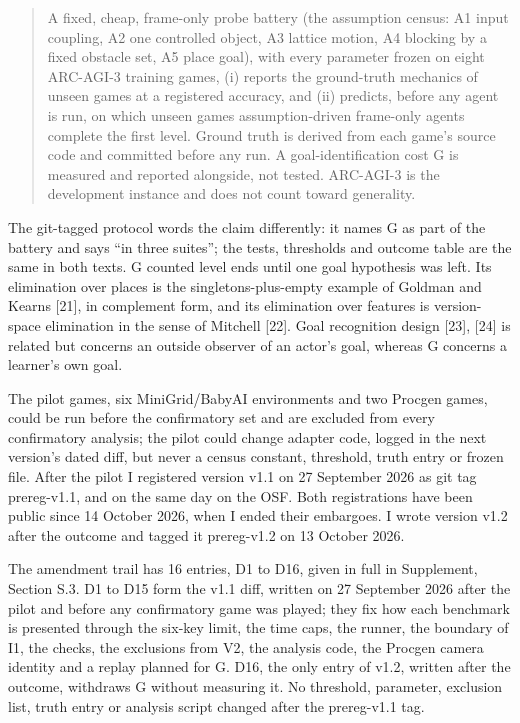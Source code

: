 \documentclass[journal]{IEEEtran}
\begin{document}
\begin{quote}
A fixed, cheap, frame-only probe battery (the assumption census: A1
input coupling, A2 one controlled object, A3 lattice motion, A4 blocking
by a fixed obstacle set, A5 place goal), with every parameter frozen on
eight ARC-AGI-3 training games, (i) reports the ground-truth mechanics
of unseen games at a registered accuracy, and (ii) predicts, before any
agent is run, on which unseen games assumption-driven frame-only agents
complete the first level. Ground truth is derived from each game's
source code and committed before any run. A goal-identification cost G
is measured and reported alongside, not tested. ARC-AGI-3 is the
development instance and does not count toward generality.
\end{quote}

The git-tagged protocol words the claim differently: it names G as part
of the battery and says ``in three suites''; the tests, thresholds and
outcome table are the same in both texts. G counted level ends until one
goal hypothesis was left. Its elimination over places is the
singletons-plus-empty example of Goldman and Kearns {[}21{]}, in
complement form, and its elimination over features is version-space
elimination in the sense of Mitchell {[}22{]}. Goal recognition design
{[}23{]}, {[}24{]} is related but concerns an outside observer of an
actor's goal, whereas G concerns a learner's own goal.

The pilot games, six MiniGrid/BabyAI environments and two Procgen games,
could be run before the confirmatory set and are excluded from every
confirmatory analysis; the pilot could change adapter code, logged in
the next version's dated diff, but never a census constant, threshold,
truth entry or frozen file. After the pilot I registered version v1.1 on
27 September 2026 as git tag prereg-v1.1, and on the same day on the
OSF. Both registrations have been public since 14 October 2026, when I
ended their embargoes. I wrote version v1.2 after the outcome and tagged
it prereg-v1.2 on 13 October 2026.

The amendment trail has 16 entries, D1 to D16, given in full in
Supplement, Section S.3. D1 to D15 form the v1.1 diff, written on 27
September 2026 after the pilot and before any confirmatory game was
played; they fix how each benchmark is presented through the six-key
limit, the time caps, the runner, the boundary of I1, the checks, the
exclusions from V2, the analysis code, the Procgen camera identity and a
replay planned for G. D16, the only entry of v1.2, written after the
outcome, withdraws G without measuring it. No threshold, parameter,
exclusion list, truth entry or analysis script changed after the
prereg-v1.1 tag.
\end{document}
